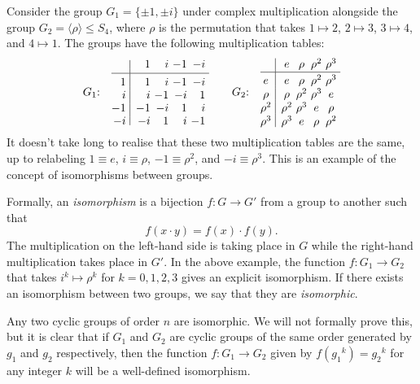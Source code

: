 Consider the group $G_1 = \{\pm 1, \pm i\}$ under complex multiplication alongside the group $G_2 = \langle\rho\rangle\leq S_4$, where $\rho$ is the permutation that takes $1\mapsto 2$, $2\mapsto 3$, $3\mapsto 4$, and $4\mapsto 1$. The groups have the following multiplication tables:
$$G_1{\rm :}\quad\vcenter{\vbox{\offinterlineskip
    \halign{ 
        \hfil $#$ & \hfil\vrule# \hfil \enskip &
        \hfil $#$ & \hfil $#$ & \hfil $#$ & \hfil $#$ \cr
        && 1 & i & -1 & -i \cr
        & height4pt &&& \cr
        \noalign{\hrule}
        & height4pt &&&\cr
        1 && 1 & i & -1 & -i \cr
        & height4pt &&&\cr
        i && i & -1 & -i & 1 \cr
        & height4pt &&&\cr
        -1 && -1 & -i & 1 & i \cr
        & height4pt &&&\cr
        -i && -i & 1 & i & -1 \cr
    }
}} \qquad
G_2{\rm :}\quad\vcenter{\vbox{\offinterlineskip
    \halign{ 
        \hfil $#$ \hfil & \hfil\vrule# \hfil \enskip &
        \hfil $#$ \hfil & \hfil $#$ \hfil & \hfil $#$ \hfil & \hfil $#$ \hfil \cr
        && e & \rho & \rho^2 & \rho^3 \cr
        & height2pt &&& \cr
        \noalign{\hrule}
        & height2pt &&&\cr
        e && e & \rho & \rho^2 & \rho^3 \cr
        & height2pt &&&\cr
        \rho && \rho & \rho^2 & \rho^3 & e \cr
        & height2pt &&&\cr
        \rho^2 && \rho^2 & \rho^3 & e & \rho \cr
        & height2pt &&&\cr
        \rho^3 && \rho^3 & e & \rho & \rho^2 \cr
    }
}}
$$
It doesn't take long to realise that these two multiplication tables are the same, up to relabeling $1 \equiv e$, $i\equiv \rho$, $-1 \equiv \rho^2$, and $-i \equiv \rho^3$. This is an example of the concept of isomorphisms between groups.

Formally, an {\it isomorphism} is a bijection $f:G\rightarrow G'$ from a group to another such that
$$f(x\cdot y) = f(x) \cdot f(y).$$
The multiplication on the left-hand side is taking place in $G$ while the right-hand multiplication takes place in $G'$. In the above example, the function $f : G_1 \rightarrow G_2$ that takes $i^k \mapsto \rho^k$ for $k=0,1,2,3$ gives an explicit isomorphism. If there exists an isomorphism between two groups, we say that they are {\it isomorphic}.

Any two cyclic groups of order $n$ are isomorphic. We will not formally prove this, but it is clear that if $G_1$ and $G_2$ are cyclic groups of the same order generated by $g_1$ and $g_2$ respectively, then the function $f : G_1 \rightarrow G_2$ given by $f({g_1}^k) = {g_2}^k$ for any integer $k$ will be a well-defined isomorphism.


